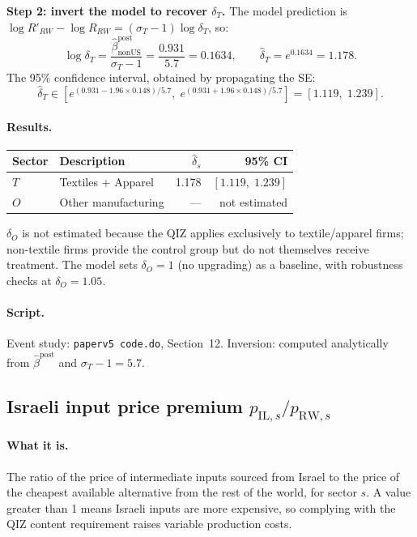 \documentclass[12pt]{article}
\begin{document}
\medskip
\noindent\textbf{Step 2: invert the model to recover $\delta_T$.}
The model prediction is $\log R'_{RW} - \log R_{RW} = (\sigma_T - 1)\log\delta_T$,
so:
\[
\log\delta_T = \frac{\hat\beta^{\mathrm{post}}_{\mathrm{nonUS}}}{\sigma_T - 1}
= \frac{0.931}{5.7} = 0.1634,
\qquad
\hat\delta_T = e^{0.1634} = 1.178.
\]
The 95\% confidence interval, obtained by propagating the SE:
\[
\hat\delta_T \in [e^{(0.931-1.96\times0.148)/5.7},\;
                   e^{(0.931+1.96\times0.148)/5.7}]
= [1.119,\; 1.239].
\]

\paragraph{Results.}
\begin{center}
\begin{tabular}{llrr}
\toprule
Sector & Description & $\hat\delta_s$ & 95\% CI \\
\midrule
$T$ & Textiles + Apparel & 1.178 & $[1.119,\; 1.239]$ \\
$O$ & Other manufacturing & --- & not estimated \\
\bottomrule
\end{tabular}
\end{center}

\noindent $\delta_O$ is not estimated because the QIZ applies exclusively
to textile/apparel firms; non-textile firms provide the control group but
do not themselves receive treatment. The model sets $\delta_O = 1$ (no
upgrading) as a baseline, with robustness checks at $\delta_O = 1.05$.

\paragraph{Script.}
Event study: \texttt{paperv5 code.do}, Section~12.
Inversion: computed analytically from $\hat\beta^{\mathrm{post}}$ and
$\sigma_T - 1 = 5.7$.

\subsection{Israeli input price premium $p_{\mathrm{IL},s}/p_{\mathrm{RW},s}$}

\paragraph{What it is.}
The ratio of the price of intermediate inputs sourced from Israel to the
price of the cheapest available alternative from the rest of the world,
for sector $s$. A value greater than 1 means Israeli inputs are more
expensive, so complying with the QIZ content requirement raises variable
production costs.
\end{document}
